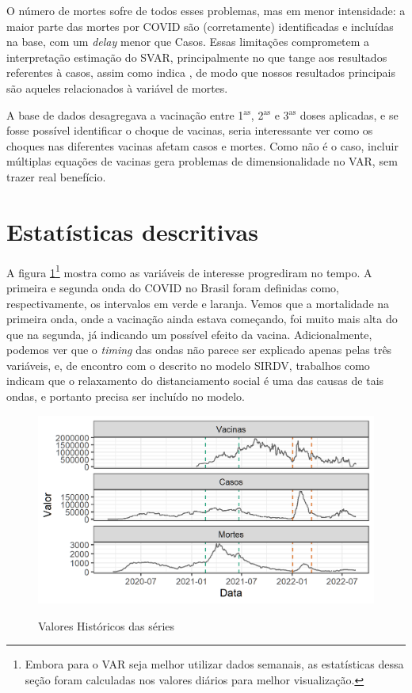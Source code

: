 \documentclass[
	12pt,				%
	oneside,			%
	a4paper,			%
	english,			%
	brazil				%
	hyperref = {colorlinks, citecolor=c1d, linkcolor=c2d, urlcolor=c3d, colorlinks}
	]{abntex2}
\newcounter{j}
\begin{document}
O número de mortes sofre de todos esses problemas, mas em menor intensidade: a maior parte das mortes por COVID são (corretamente) identificadas e incluídas na base, com um \textit{delay} menor que Casos. Essas limitações comprometem a interpretação estimação do SVAR, principalmente no que tange aos resultados referentes à casos, assim como indica \textcite{Escobar2019}, de modo que nossos resultados principais são aqueles relacionados à variável de mortes.

A base de dados desagregava a vacinação entre 1$^\text{as}$, 2$^\text{as}$ e 3$^\text{as}$ doses aplicadas, e se fosse possível identificar o choque de vacinas, seria interessante ver como os choques nas diferentes vacinas afetam casos e mortes. Como não é o caso, incluir múltiplas equações de vacinas gera problemas de dimensionalidade no VAR, sem trazer real benefício.


\section{Estatísticas descritivas}\label{sec:stat}
A figura \ref{fig:histval}\footnote{Embora para o VAR seja melhor utilizar dados semanais, as estatísticas dessa seção foram calculadas nos valores diários para melhor visualização.} mostra como as variáveis de interesse progrediram no tempo. A primeira e segunda onda do COVID no Brasil foram definidas como, respectivamente, os intervalos em verde e laranja. Vemos que a mortalidade na primeira onda, onde a vacinação ainda estava começando, foi muito mais alta do que na segunda, já indicando um possível efeito da vacina. Adicionalmente, podemos ver que o \textit{timing} das ondas não parece ser explicado apenas pelas três variáveis, e, de encontro com o descrito no modelo SIRDV, trabalhos como \textcite{Moraes2021} indicam que o relaxamento do distanciamento social é uma das causas de tais ondas, e portanto precisa ser incluído no modelo.

\begin{figure}[H]
    \centering
    \caption{Valores Históricos das séries}
    \includegraphics[]{Figuras/histval.png} %
    \label{fig:histval}
\end{figure}
\end{document}
